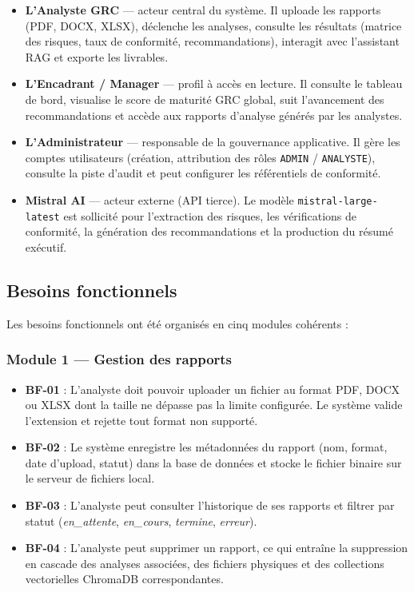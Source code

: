\begin{itemize}
  \item \textbf{L'Analyste GRC} — acteur central du système. Il uploade
    les rapports (PDF, DOCX, XLSX), déclenche les analyses, consulte les
    résultats (matrice des risques, taux de conformité, recommandations),
    interagit avec l'assistant RAG et exporte les livrables.

  \item \textbf{L'Encadrant / Manager} — profil à accès en lecture. Il
    consulte le tableau de bord, visualise le score de maturité GRC global,
    suit l'avancement des recommandations et accède aux rapports d'analyse
    générés par les analystes.

  \item \textbf{L'Administrateur} — responsable de la gouvernance applicative.
    Il gère les comptes utilisateurs (création, attribution des rôles
    \texttt{ADMIN} / \texttt{ANALYSTE}), consulte la piste d'audit et
    peut configurer les référentiels de conformité.

  \item \textbf{Mistral AI} — acteur externe (API tierce). Le modèle
    \texttt{mistral-large-latest} est sollicité pour l'extraction des
    risques, les vérifications de conformité, la génération des
    recommandations et la production du résumé exécutif.
\end{itemize}

\subsection{Besoins fonctionnels}

Les besoins fonctionnels ont été organisés en cinq modules cohérents :

\subsubsection*{Module 1 — Gestion des rapports}

\begin{itemize}
  \item \textbf{BF-01} : L'analyste doit pouvoir uploader un fichier au
    format PDF, DOCX ou XLSX dont la taille ne dépasse pas la limite
    configurée. Le système valide l'extension et rejette tout format non
    supporté.
  \item \textbf{BF-02} : Le système enregistre les métadonnées du rapport
    (nom, format, date d'upload, statut) dans la base de données et stocke
    le fichier binaire sur le serveur de fichiers local.
  \item \textbf{BF-03} : L'analyste peut consulter l'historique de ses
    rapports et filtrer par statut (\textit{en\_attente}, \textit{en\_cours},
    \textit{termine}, \textit{erreur}).
  \item \textbf{BF-04} : L'analyste peut supprimer un rapport, ce qui
    entraîne la suppression en cascade des analyses associées, des fichiers
    physiques et des collections vectorielles ChromaDB correspondantes.
\end{itemize}

